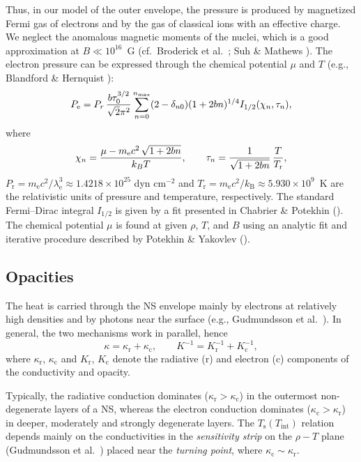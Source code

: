 \documentclass{aa}
\begin{document}
Thus, in our model of the outer envelope, the pressure
is produced by magnetized Fermi gas of electrons and
by the gas of classical ions
with an effective charge.
We neglect the anomalous magnetic moments
of the nuclei, which is a good approximation at $B\ll10^{16}$~G
(cf.\ Broderick et al.\ \cite{bpl00}; Suh \& Mathews \cite{suh}).
The electron pressure can be expressed through
the chemical potential $\mu$ and $T$ 
(e.g., Blandford \& Hernquist \cite{bh82}): 
\begin{equation}
   P_\mathrm{e} =
   P_r\,{b \tau_0^{3/2}\over\sqrt2\pi^2}
   \sum_{n=0}^{n_\mathrm{max}} (2-\delta_{n0})
           (1+2bn)^{1/4} I_{1/2}(\chi_n,\tau_n),
\label{presmag}
\end{equation}
where 
\[
   \chi_n = {\mu-m_\mathrm{e} c^2\,\sqrt{1+2bn} \over k_B T},
\qquad
   \tau_n = {1\over\sqrt{1+2bn}}\,{T\over T_\mathrm{r}},
\]
$P_\mathrm{r}=m_\mathrm{e} c^2/\lambda_\mathrm{e}^3
\approx1.4218\times10^{25}$ dyn cm$^{-2}$
and $T_\mathrm{r}=m_\mathrm{e} c^2/k_\mathrm{B}\approx5.930 \times10^9$~K
are the relativistic units of pressure and temperature, respectively.
The standard Fermi--Dirac integral
$  I_{1/2} $
is given by a fit presented in Chabrier \& Potekhin (\cite{cp98}).
The chemical potential $\mu$ is found at given $\rho$, $T$, and $B$
using an analytic fit and iterative procedure described by 
Potekhin \& Yakovlev (\cite{py96}).

\subsection{Opacities}
\label{sect-opa}
%
The heat is carried through the NS envelope
mainly by electrons at relatively high densities
and by photons near the surface (e.g., Gudmundsson et al.\ \cite{gpe83}).
In general, the two mechanisms work in parallel, hence
%
\begin{equation}
   \kappa=\kappa_\mathrm{r}+\kappa_\mathrm{c},
\qquad
 K^{-1} = {K}_\mathrm{r}^{-1} + {K}_\mathrm{c}^{-1}, 
 \label{op}
\end{equation}      
%
where $\kappa_\mathrm{r}$, $\kappa_\mathrm{c}$ 
and ${K}_\mathrm{r}$, ${K}_\mathrm{c}$ denote
the radiative (r) and electron (c)
components of the conductivity and opacity. 

Typically, the radiative conduction dominates
($\kappa_\mathrm{r}>\kappa_\mathrm{c}$) in 
the outermost non-degenerate layers of a NS,
whereas the electron conduction 
dominates ($\kappa_\mathrm{c}>\kappa_\mathrm{r}$)
in deeper, moderately and strongly degenerate layers.
The $T_\mathrm{s}(T_\mathrm{int})$ 
relation depends mainly on the conductivities in the
\emph{sensitivity strip} on the $\rho-T$ plane
(Gudmundsson et al.\ \cite{gpe83})
placed near the \emph{turning point},
where $\kappa_\mathrm{c}\sim\kappa_\mathrm{r}$.
\end{document}
